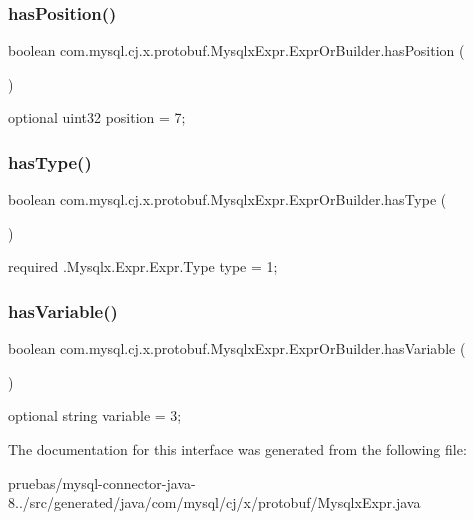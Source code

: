 \subsubsection{\texorpdfstring{has\+Position()}{hasPosition()}}
{\footnotesize\ttfamily boolean com.\+mysql.\+cj.\+x.\+protobuf.\+Mysqlx\+Expr.\+Expr\+Or\+Builder.\+has\+Position (\begin{DoxyParamCaption}{ }\end{DoxyParamCaption})}

{\ttfamily optional uint32 position = 7;} \mbox{\label{interfacecom_1_1mysql_1_1cj_1_1x_1_1protobuf_1_1_mysqlx_expr_1_1_expr_or_builder_a704435dcecb8f35a1673277d2b9b0584}} 
\subsubsection{\texorpdfstring{has\+Type()}{hasType()}}
{\footnotesize\ttfamily boolean com.\+mysql.\+cj.\+x.\+protobuf.\+Mysqlx\+Expr.\+Expr\+Or\+Builder.\+has\+Type (\begin{DoxyParamCaption}{ }\end{DoxyParamCaption})}

{\ttfamily required .Mysqlx.\+Expr.\+Expr.\+Type type = 1;} \mbox{\label{interfacecom_1_1mysql_1_1cj_1_1x_1_1protobuf_1_1_mysqlx_expr_1_1_expr_or_builder_ae660c7bec97f5ae9f3086fbd8a042648}} 
\subsubsection{\texorpdfstring{has\+Variable()}{hasVariable()}}
{\footnotesize\ttfamily boolean com.\+mysql.\+cj.\+x.\+protobuf.\+Mysqlx\+Expr.\+Expr\+Or\+Builder.\+has\+Variable (\begin{DoxyParamCaption}{ }\end{DoxyParamCaption})}

{\ttfamily optional string variable = 3;} 

The documentation for this interface was generated from the following file\+:\begin{DoxyCompactItemize}
\item 
pruebas/mysql-\/connector-\/java-\/8../src/generated/java/com/mysql/cj/x/protobuf/Mysqlx\+Expr.\+java\end{DoxyCompactItemize}
